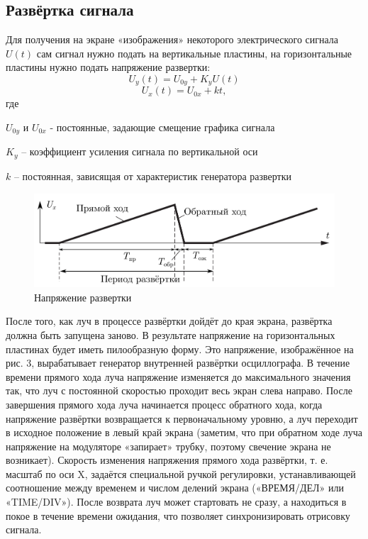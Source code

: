\documentclass[a4paper, 12pt]{article}
\begin{document}
\subsection{Развёртка сигнала}
Для получения на экране «изображения»
некоторого электрического сигнала $U(t)$ сам сигнал нужно подать на
вертикальные пластины, на горизонтальные пластины нужно подать напряжение развертки:
\begin{equation}
    U_y(t)=U_{0y}+K_yU(t)
\end{equation}
\begin{equation}
    U_x(t)=U_{0x}+kt,
\end{equation}
где

$U_{0y}$ и $U_{0x}$ - постоянные, задающие смещение графика сигнала

$K_y$ -- коэффициент усиления сигнала по вертикальной оси

$k$ -- постоянная, зависящая от характеристик генератора развертки

\begin{figure}[h]
    \centering
    \includegraphics[scale=0.7]{ux.png}
    \caption{Напряжение развертки}
    \label{fig:ux}
\end{figure}

После того, как луч в процессе развёртки дойдёт до края экрана,
развёртка должна быть запущена заново. В результате напряжение
на горизонтальных пластинах будет иметь пилообразную форму. Это напряжение, изображённое на рис. 3, вырабатывает генератор внутренней развёртки осциллографа. В течение времени прямого хода луча напряжение изменяется до максимального значения так, что луч с постоянной скоростью проходит весь экран слева направо. После завершения прямого хода луча начинается процесс обратного хода, когда напряжение развёртки возвращается к первоначальному уровню, а луч переходит в исходное положение в левый край экрана (заметим, что при обратном ходе луча напряжение на модуляторе «запирает» трубку, поэтому свечение экрана не возникает). Скорость изменения напряжения прямого хода развёртки, т. е. масштаб по оси X, задаётся специальной ручкой регулировки, устанавливающей соотношение между временем и числом делений экрана («ВРЕМЯ/ДЕЛ» или «TIME/DIV»). После возврата луч может
стартовать не сразу, а находиться в покое в течение времени ожидания, что позволяет синхронизировать отрисовку сигнала.
\end{document}
